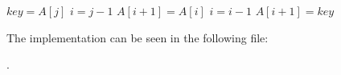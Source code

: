 
\begin{algorithmic}[1]
            \STATE $\mathit{key} = A[j]$
            \STATE {}
            \STATE $i = j-1$
            \STATE $A[i+1]= A[i]$
            \STATE $i = i-1$
        \ENDWHILE
            \STATE $A[i+1] = \mathit{key}$
    \ENDFOR
\end{algorithmic}

The implementation can be seen in the following file:

.
